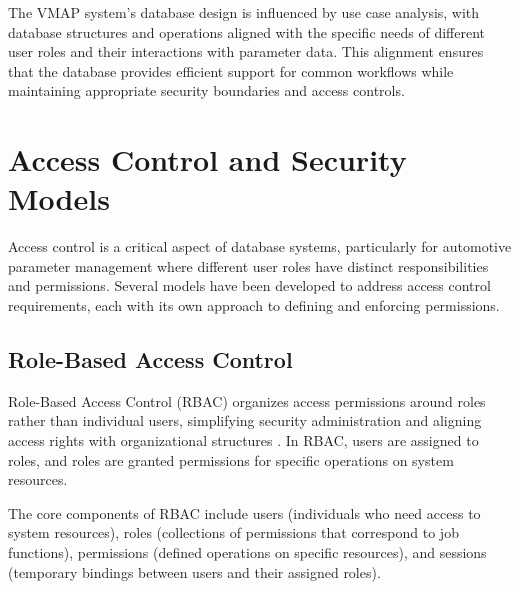 The VMAP system's database design is influenced by use case analysis, with database structures and operations aligned with the specific needs of different user roles and their interactions with parameter data. This alignment ensures that the database provides efficient support for common workflows while maintaining appropriate security boundaries and access controls.

\section{Access Control and Security Models}
\label{sec:access-control-security-models}

Access control is a critical aspect of database systems, particularly for automotive parameter management where different user roles have distinct responsibilities and permissions. Several models have been developed to address access control requirements, each with its own approach to defining and enforcing permissions.

\subsection{Role-Based Access Control}
\label{subsec:role-based-access-control}

Role-Based Access Control (RBAC) organizes access permissions around roles rather than individual users, simplifying security administration and aligning access rights with organizational structures \cite{sandhu1998role}. In RBAC, users are assigned to roles, and roles are granted permissions for specific operations on system resources.

The core components of RBAC include users (individuals who need access to system resources), roles (collections of permissions that correspond to job functions), permissions (defined operations on specific resources), and sessions (temporary bindings between users and their assigned roles).

